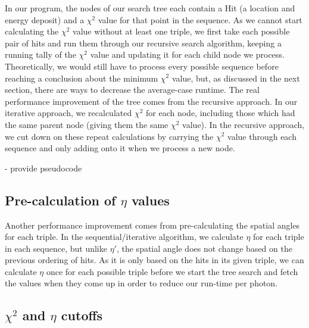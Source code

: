 In our program, the nodes of our search tree each contain a Hit (a location and energy deposit) and a $\chi^2$ value for that point in the sequence. As we cannot start calculating the $\chi^2$ value without at least one triple, we first take each possible pair of hits and run them through our recursive search algorithm, keeping a running tally of the $\chi^2$ value and updating it for each child node we process. Theoretically, we would still have to process every possible sequence before reaching a conclusion about the minimum $\chi^2$ value, but, as discussed in the next section, there are ways to decrease the average-case runtime. The real performance improvement of the tree comes from the recursive approach. In our iterative approach, we recalculated $\chi^2$ for each node, including those which had the same parent node (giving them the same $\chi^2$ value). In the recursive approach, we cut down on these repeat calculations by carrying the $\chi^2$ value through each sequence and only adding onto it when we process a new node. 

- provide pseudocode

\subsection{Pre-calculation of $\eta$ values}
Another performance improvement comes from pre-calculating the spatial angles for each triple. In the sequential/iterative algorithm, we calculate $\eta$ for each triple in each sequence, but unlike $\eta'$, the spatial angle does not change based on the previous ordering of hits. As it is only based on the hits in its given triple, we can calculate $\eta$ once for each possible triple before we start the tree search and fetch the values when they come up in order to reduce our run-time per photon.

\subsection{$\chi^2$ and $\eta$ cutoffs}

